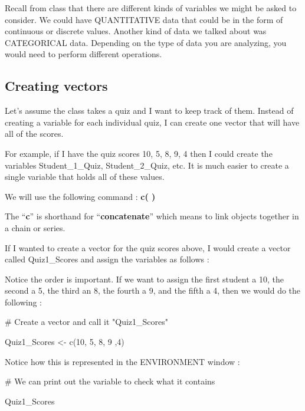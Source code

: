 \documentclass[
  letterpaper,
  DIV=11,
  numbers=noendperiod]{scrreprt}
\newenvironment{Shaded}{\begin{snugshade}}{\end{snugshade}}
\newcommand{\CommentTok}[1]{\textcolor[rgb]{0.37,0.37,0.37}{#1}}
\newcommand{\DecValTok}[1]{\textcolor[rgb]{0.68,0.00,0.00}{#1}}
\newcommand{\FunctionTok}[1]{\textcolor[rgb]{0.28,0.35,0.67}{#1}}
\newcommand{\NormalTok}[1]{\textcolor[rgb]{0.00,0.23,0.31}{#1}}
\newcommand{\OtherTok}[1]{\textcolor[rgb]{0.00,0.23,0.31}{#1}}
\begin{document}
Recall from class that there are different kinds of variables we might
be asked to consider. We could have QUANTITATIVE data that could be in
the form of continuous or discrete values. Another kind of data we
talked about was CATEGORICAL data. Depending on the type of data you are
analyzing, you would need to perform different operations.

\subsection*{Creating vectors}\label{creating-vectors}

Let's assume the class takes a quiz and I want to keep track of them.
Instead of creating a variable for each individual quiz, I can create
one vector that will have all of the scores.

For example, if I have the quiz scores 10, 5, 8, 9, 4 then I could
create the variables Student\_1\_Quiz, Student\_2\_Quiz, etc. It is much
easier to create a single variable that holds all of these values.

We will use the following command : \textbf{c( )}

The ``\textbf{c}'' is shorthand for ``\textbf{concatenate}'' which means
to link objects together in a chain or series.

If I wanted to create a vector for the quiz scores above, I would create
a vector called Quiz1\_Scores and assign the variables as follows :

Notice the order is important. If we want to assign the first student a
10, the second a 5, the third an 8, the fourth a 9, and the fifth a 4,
then we would do the following :

\begin{Shaded}
\begin{Highlighting}[]
\CommentTok{\# Create a vector and call it "Quiz1\_Scores" }

\NormalTok{Quiz1\_Scores }\OtherTok{\textless{}{-}} \FunctionTok{c}\NormalTok{(}\DecValTok{10}\NormalTok{, }\DecValTok{5}\NormalTok{, }\DecValTok{8}\NormalTok{, }\DecValTok{9}\NormalTok{ ,}\DecValTok{4}\NormalTok{)}
\end{Highlighting}
\end{Shaded}

Notice how this is represented in the ENVIRONMENT window :

\begin{Shaded}
\begin{Highlighting}[]
\CommentTok{\# We can print out the variable to check what it contains}

\NormalTok{Quiz1\_Scores     }
\end{Highlighting}
\end{Shaded}
\end{document}
